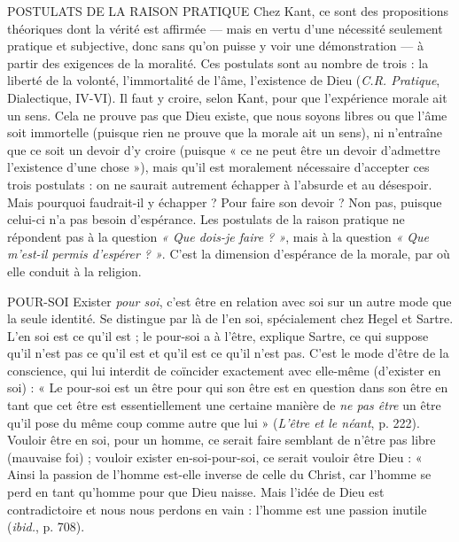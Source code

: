 POSTULATS DE LA RAISON PRATIQUE Chez Kant, ce sont des propositions
théoriques dont la vérité
est affirmée — mais en vertu d’une nécessité seulement pratique et subjective,
donc sans qu’on puisse y voir une démonstration — à partir des exigences
de la moralité. Ces postulats sont au nombre de trois : la liberté de la volonté,
l’immortalité de l’âme, l'existence de Dieu ({\it C.R. Pratique}, Dialectique, IV-VI).
Il faut y croire, selon Kant, pour que l’expérience morale ait un sens. Cela ne
prouve pas que Dieu existe, que nous soyons libres ou que l'âme soit immortelle
(puisque rien ne prouve que la morale ait un sens), ni n’entraîne que ce
soit un devoir d’y croire (puisque « ce ne peut être un devoir d’admettre l’existence
d’une chose »), mais qu’il est moralement nécessaire d’accepter ces trois
postulats : on ne saurait autrement échapper à l'absurde et au désespoir. Mais
pourquoi faudrait-il y échapper ? Pour faire son devoir ? Non pas, puisque
celui-ci n’a pas besoin d’espérance. Les postulats de la raison pratique ne répondent
pas à la question {\it « Que dois-je faire ? »}, mais à la question {\it « Que m'est-il
permis d'espérer ? »}. C’est la dimension d’espérance de la morale, par où elle
conduit à la religion.

POUR-SOI  Exister {\it pour soi}, c’est être en relation avec soi sur un autre mode
que la seule identité. Se distingue par là de l'en soi, spécialement
chez Hegel et Sartre. L’en soi est ce qu’il est ; le pour-soi a à l’être,
explique Sartre, ce qui suppose qu’il n’est pas ce qu’il est et qu’il est ce qu’il
n’est pas. C’est le mode d’être de la conscience, qui lui interdit de coïncider
exactement avec elle-même (d’exister en soi) : « Le pour-soi est un être pour qui
son être est en question dans son être en tant que cet être est essentiellement
une certaine manière de {\it ne pas être} un être qu’il pose du même coup comme
autre que lui » ({\it L'être et le néant}, p. 222). Vouloir être en soi, pour un homme,
ce serait faire semblant de n’être pas libre (mauvaise foi) ; vouloir exister en-soi-pour-soi,
ce serait vouloir être Dieu : « Ainsi la passion de l’homme est-elle
inverse de celle du Christ, car l’homme se perd en tant qu'homme pour que
Dieu naisse. Mais l’idée de Dieu est contradictoire et nous nous perdons en
vain : l’homme est une passion inutile ({\it ibid.}, p. 708).

